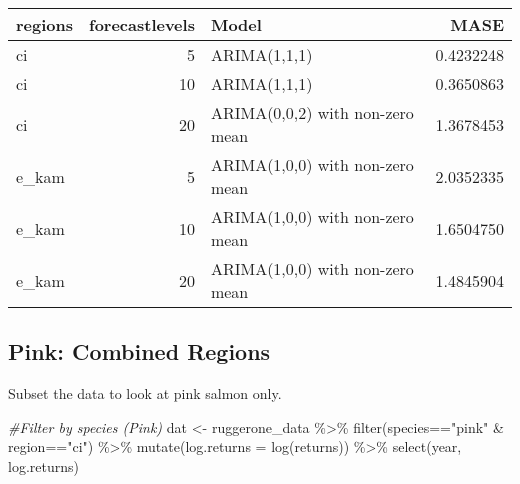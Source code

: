 \documentclass[
]{article}
\newenvironment{Shaded}{\begin{snugshade}}{\end{snugshade}}
\newcommand{\AttributeTok}[1]{\textcolor[rgb]{0.77,0.63,0.00}{#1}}
\newcommand{\CommentTok}[1]{\textcolor[rgb]{0.56,0.35,0.01}{\textit{#1}}}
\newcommand{\ControlFlowTok}[1]{\textcolor[rgb]{0.13,0.29,0.53}{\textbf{#1}}}
\newcommand{\FunctionTok}[1]{\textcolor[rgb]{0.00,0.00,0.00}{#1}}
\newcommand{\NormalTok}[1]{#1}
\newcommand{\OtherTok}[1]{\textcolor[rgb]{0.56,0.35,0.01}{#1}}
\newcommand{\SpecialCharTok}[1]{\textcolor[rgb]{0.00,0.00,0.00}{#1}}
\newcommand{\StringTok}[1]{\textcolor[rgb]{0.31,0.60,0.02}{#1}}
\begin{document}
\begin{Shaded}
\end{Shaded}

\begin{longtable}[]{@{}lrlr@{}}
\toprule()
regions & forecastlevels & Model & MASE \\
\midrule()
\endhead
ci & 5 & ARIMA(1,1,1) & 0.4232248 \\
ci & 10 & ARIMA(1,1,1) & 0.3650863 \\
ci & 20 & ARIMA(0,0,2) with non-zero mean & 1.3678453 \\
e\_kam & 5 & ARIMA(1,0,0) with non-zero mean & 2.0352335 \\
e\_kam & 10 & ARIMA(1,0,0) with non-zero mean & 1.6504750 \\
e\_kam & 20 & ARIMA(1,0,0) with non-zero mean & 1.4845904 \\
\bottomrule()
\end{longtable}

\hypertarget{pink-combined-regions}{%
\subsection{Pink: Combined Regions}\label{pink-combined-regions}}

Subset the data to look at pink salmon only.

\begin{Shaded}
\begin{Highlighting}[]
\CommentTok{\#Filter by species (Pink)}
\NormalTok{dat }\OtherTok{\textless{}{-}}\NormalTok{ ruggerone\_data }\SpecialCharTok{\%\textgreater{}\%}  
  \FunctionTok{filter}\NormalTok{(species}\SpecialCharTok{==}\StringTok{"pink"} \SpecialCharTok{\&}\NormalTok{ region}\SpecialCharTok{==}\StringTok{"ci"}\NormalTok{) }\SpecialCharTok{\%\textgreater{}\%} 
  \FunctionTok{mutate}\NormalTok{(}\AttributeTok{log.returns =} \FunctionTok{log}\NormalTok{(returns)) }\SpecialCharTok{\%\textgreater{}\%} 
  \FunctionTok{select}\NormalTok{(year, log.returns)}
\end{Highlighting}
\end{Shaded}
\end{document}
